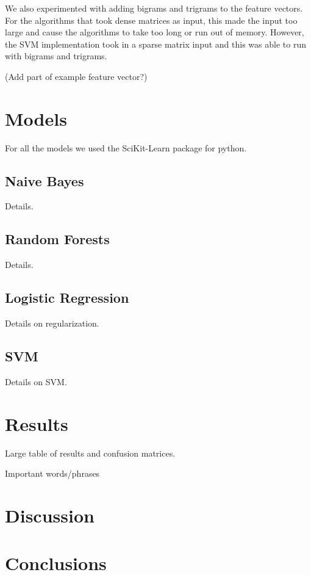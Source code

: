 \documentclass[journal]{IEEEtran}
\begin{document}
We also experimented with adding bigrams and trigrams to the feature vectors. For the algorithms that took dense matrices as input, this made the input too large and cause the algorithms to take too long or run out of memory. However, the SVM implementation took in a sparse matrix input and this was able to run with bigrams and trigrams.

(Add part of example feature vector?)

\section{Models}

For all the models we used the SciKit-Learn package \cite{scikit-learn} for python.

\subsection{Naive Bayes}

Details.

\subsection{Random Forests}

Details.

\subsection{Logistic Regression}

Details on regularization.

\subsection{SVM}

Details on SVM.

\section{Results}

Large table of results and confusion matrices.

Important words/phrases

\section{Discussion}



\section{Conclusions}
\end{document}
